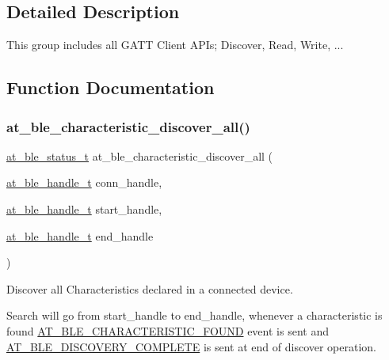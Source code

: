 \subsection{Detailed Description}
This group includes all G\+A\+TT Client A\+P\+Is; Discover, Read, Write, ... 



\subsection{Function Documentation}
\mbox{\label{group__gatt__client__group_ga219f9e312abd98aa41c5cce56fcc1dde}} 
\subsubsection{\texorpdfstring{at\_ble\_characteristic\_discover\_all()}{at\_ble\_characteristic\_discover\_all()}}
{\footnotesize\ttfamily \mbox{\hyperlink{group__error__codes__group_ga3b1db9b95feb157b3c188ca27fe76988}{at\+\_\+ble\+\_\+status\+\_\+t}} at\+\_\+ble\+\_\+characteristic\+\_\+discover\+\_\+all (\begin{DoxyParamCaption}\item[{\mbox{\hyperlink{at__ble__api_8h_abd23646d0c662860741f787efc8456f2}{at\+\_\+ble\+\_\+handle\+\_\+t}}}]{conn\+\_\+handle,  }\item[{\mbox{\hyperlink{at__ble__api_8h_abd23646d0c662860741f787efc8456f2}{at\+\_\+ble\+\_\+handle\+\_\+t}}}]{start\+\_\+handle,  }\item[{\mbox{\hyperlink{at__ble__api_8h_abd23646d0c662860741f787efc8456f2}{at\+\_\+ble\+\_\+handle\+\_\+t}}}]{end\+\_\+handle }\end{DoxyParamCaption})}



Discover all Characteristics declared in a connected device. 

Search will go from start\+\_\+handle to end\+\_\+handle, whenever a characteristic is found \mbox{\hyperlink{at__ble__api_8h_a3324640b95f33169515f89738ed5baebad01cd835d1b797b8ea155581470c91b8}{A\+T\+\_\+\+B\+L\+E\+\_\+\+C\+H\+A\+R\+A\+C\+T\+E\+R\+I\+S\+T\+I\+C\+\_\+\+F\+O\+U\+ND}} event is sent and \mbox{\hyperlink{at__ble__api_8h_a3324640b95f33169515f89738ed5baeba8229c390a23c583fa2971431fae60717}{A\+T\+\_\+\+B\+L\+E\+\_\+\+D\+I\+S\+C\+O\+V\+E\+R\+Y\+\_\+\+C\+O\+M\+P\+L\+E\+TE}} is sent at end of discover operation.


